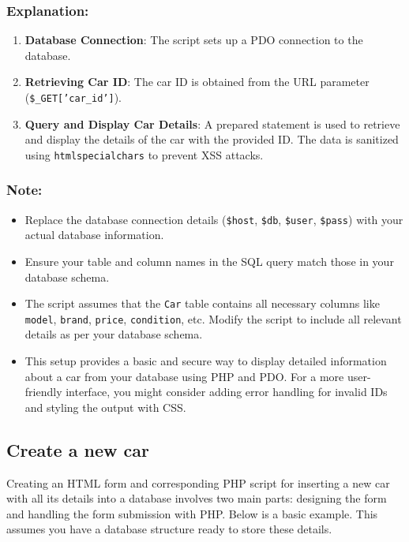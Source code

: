 \documentclass[11pt]{article}
\begin{document}
\subsubsection{Explanation:}
\label{sec:org6b3ba8f}
\begin{enumerate}
\item \textbf{Database Connection}: The script sets up a PDO connection to the
database.

\item \textbf{Retrieving Car ID}: The car ID is obtained from the URL parameter
(\texttt{\$\_GET['car\_id']}).

\item \textbf{Query and Display Car Details}: A prepared statement is used to
retrieve and display the details of the car with the provided ID. The
data is sanitized using \texttt{htmlspecialchars} to prevent XSS attacks.
\end{enumerate}

\subsubsection{Note:}
\label{sec:org04e5d0f}
\begin{itemize}
\item Replace the database connection details (\texttt{\$host}, \texttt{\$db}, \texttt{\$user},
\texttt{\$pass}) with your actual database information.
\item Ensure your table and column names in the SQL query match those in
your database schema.
\item The script assumes that the \texttt{Car} table contains all necessary columns
like \texttt{model}, \texttt{brand}, \texttt{price}, \texttt{condition}, etc. Modify the script to
include all relevant details as per your database schema.
\item This setup provides a basic and secure way to display detailed
information about a car from your database using PHP and PDO. For a
more user-friendly interface, you might consider adding error handling
for invalid IDs and styling the output with CSS.
\end{itemize}

\subsection{Create a new car}
\label{sec:orgd783d5c}
Creating an HTML form and corresponding PHP script for inserting a new
car with all its details into a database involves two main parts:
designing the form and handling the form submission with PHP. Below is a
basic example. This assumes you have a database structure ready to store
these details.
\end{document}
